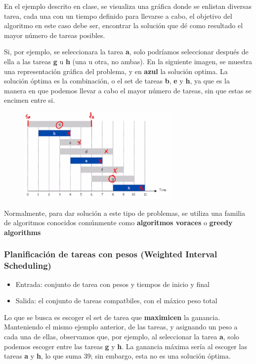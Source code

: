 \documentclass[letterpaper]{article}
\begin{document}
En el ejemplo descrito en clase, se visualiza una gráfica donde se enlistan
diversas tarea, cada una con un tiempo definido para llevarse a cabo, el
objetivo del algoritmo en este caso debe ser, encontrar la solución que dé como
resultado el mayor número de tareas posibles.

Si, por ejemplo, se seleccionara la tarea \textbf{a}, solo podríamos seleccionar
después de ella a las tareas \textbf{g} u \textbf{h} (una u otra, no ambas). En la siguiente
imagen, se muestra una representación gráfica del problema, y en \textbf{azul} la
solución optima. La solución óptima es la combinación, o el set de tareas
\textbf{b}, \textbf{e} y \textbf{h}, ya que es la manera en que podemos llevar a cabo el mayor número
de tareas, sin que estas se encimen entre si.

\begin{figure}
    \centerging
    \includegraphics[width=0.7\textwidth, height=0.4\textwidth]
        {./img/interval_scheduling.png}
\end{figure}

Normalmente, para dar solución a este tipo de problemas, se utiliza una familia
de algoritmos conocidos comúnmente como \textbf{algoritmos voraces} o \textbf{greedy
algorithms}

\subsubsection{Planificación de tareas con pesos (Weighted Interval Scheduling)}
\label{sec:orgdf32a8b}
\begin{itemize}
\item Entrada: conjunto de tarea con pesos y tiempos de inicio y final
\item Salida: el conjunto de tareas compatbiles, con el máxico peso total
\end{itemize}

Lo que se busca es escoger el set de tarea que \textbf{maximicen} la ganancia.
Manteniendo el mismo ejemplo anterior, de las tareas, y asignando un peso a
cada una de ellas, observamos que, por ejemplo, al seleccionar la tarea \textbf{a},
solo podemos escoger entre las tareas \textbf{g} y \textbf{h}. La ganancia máxima sería al
escoger las tareas \textbf{a} y \textbf{h}, lo que suma 39; sin embargo, esta no es una
solución óptima.
\end{document}
